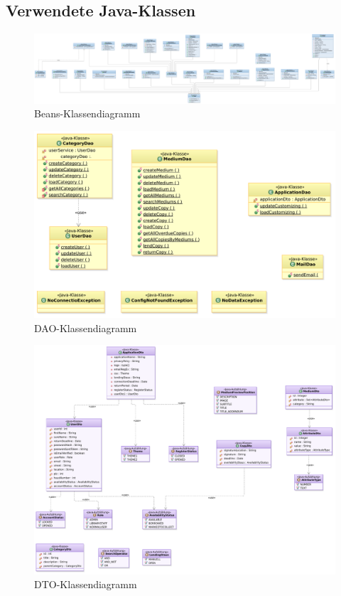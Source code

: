 \documentclass{article}
\begin{document}
\subsection{Verwendete Java-Klassen}

\begin{figure}[H]
    \includegraphics[scale=0.17]{Beansdiagramm.pdf}
    \caption{Beans-Klassendiagramm}
    \label{fig:UML-Klassendkígrramm}
\end{figure}


    \begin{figure}[H]
    \includegraphics[scale=0.4]{Daodiagramm.pdf}
    \caption{DAO-Klassendiagramm}
    \label{fig:UML-Klassendkígrramm}
\end{figure}

\begin{figure}[H]
    \includegraphics[scale=0.4]{Dtodiagramm.pdf}
    \caption{DTO-Klassendiagramm}
    \label{fig:UML-Klassendkígrramm}
\end{figure}
\end{document}
